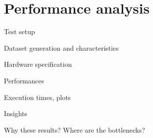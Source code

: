

\section{Performance analysis}

    \begin{frame}{Test setup}

        Dataset generation and characteristics

        Hardware specification
        
    \end{frame}


    \begin{frame}{Performances}

        Execution times, plots

        
        
    \end{frame}


    \begin{frame}{Insights}

        Why these results? Where are the bottlenecks?
        
    \end{frame}